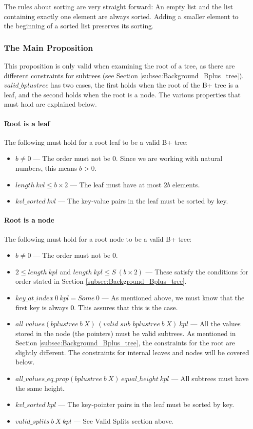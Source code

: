 The rules about sorting are very straight forward: An empty list and the list containing exactly one element are always sorted. Adding a smaller element to the beginning of a sorted list preserves its sorting.

\subsubsection{The Main Proposition}
This proposition is only valid when examining the root of a tree, as there are different constraints for subtrees (see Section \ref{subsec:Background_Bplus_tree}). $valid\_bplustree$ has two cases, the first holds when the root of the B+ tree is a leaf, and the second holds when the root is a node. The various properties that must hold are explained below.

\paragraph{Root is a leaf}
The following must hold for a root leaf to be a valid B+ tree:
\label{valid_root_is_a_leaf}
\begin{itemize}
\item $b \neq 0$ --- The order must not be 0. Since we are working with natural numbers, this means $b > 0$.
\item $length\ kvl \leq b \times 2 $ --- The leaf must have at most $2b$ elements.
\item $kvl\_sorted\ kvl$ --- The key-value pairs in the leaf must be sorted by key.
\end{itemize}

\paragraph{Root is a node}
The following must hold for a root node to be a valid B+ tree:
\label{valid_root_is_a_node}
\begin{itemize}
\item $b \neq 0$ --- The order must not be 0.
\item $2 \leq length\ kpl$ and $length\ kpl \leq S\ (b \times 2)$ --- These satisfy the conditions for order stated in Section \ref{subsec:Background_Bplus_tree}.
\item $key\_at\_index\ 0\ kpl = Some\ 0$ --- As mentioned above, we must know that the first key is always 0. This assures that this is the case.
\item $all\_values (bplustree\ b\ X)\ (valid\_sub\_bplustree\ b\ X)\ kpl$ --- All the values stored in the node (the pointers) must be valid subtrees. As mentioned in Section \ref{subsec:Background_Bplus_tree}, the constraints for the root are slightly different. The constraints for internal leaves and nodes will be covered below.
\item $all\_values\_eq\_prop (bplustree\ b\ X)\ equal\_height\ kpl$ --- All subtrees must have the same height.
\item $kvl\_sorted\ kpl$ --- The key-pointer pairs in the leaf must be sorted by key.
\item $valid\_splits\ b \ X\ kpl$ --- See Valid Splits section above.
\end{itemize}

